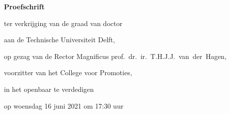 \begin{titlepage}

\begin{center}

\vspace*{2\bigskipamount}

\begin{spacing}{1.6}
{\makeatletter
\titlestyle\bfseries\LARGE\@title
\makeatother}
\end{spacing}

{\makeatletter
\ifx\@subtitle\undefined\else
    \bigskip
    \titlefont\titleshape\Large\@subtitle
\fi
\makeatother}

\end{center}

\cleardoublepage
\thispagestyle{empty}

\begin{center}


\vspace*{2\bigskipamount}

\begin{spacing}{1.6}
{\makeatletter
\titlestyle\bfseries\LARGE\@title
\makeatother}
\end{spacing}

{\makeatletter
\ifx\@subtitle\undefined\else
    \bigskip
    \titlefont\titleshape\Large\@subtitle
\fi
\makeatother}

\vfill


{\Large\titlefont\bfseries Proefschrift}

\bigskip
\bigskip

ter verkrijging van de graad van doctor

aan de Technische Universiteit Delft,

op gezag van de Rector Magnificus prof.~dr.~ir.~T.H.J.J.~van~der~Hagen,

voorzitter van het College voor Promoties,

in het openbaar te verdedigen

op woensdag 16 juni 2021 om 17:30 uur


\end{center}
\end{titlepage}
